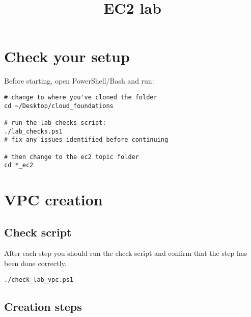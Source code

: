\documentclass{pgnotes}
\title{EC2 lab}
\begin{document}
\maketitle

\section{Check your setup}

Before starting, open PowerShell/Bash and run:
\begin{verbatim}
# change to where you've cloned the folder
cd ~/Desktop/cloud_foundations

# run the lab checks script:
./lab_checks.ps1
# fix any issues identified before continuing

# then change to the ec2 topic folder
cd *_ec2
\end{verbatim}

\section{VPC creation}

\subsection{Check script}

After each step you should run the check script and confirm that the step has been done correctly.
\begin{verbatim}
./check_lab_vpc.ps1
\end{verbatim}

\subsection{Creation steps}
\end{document}
